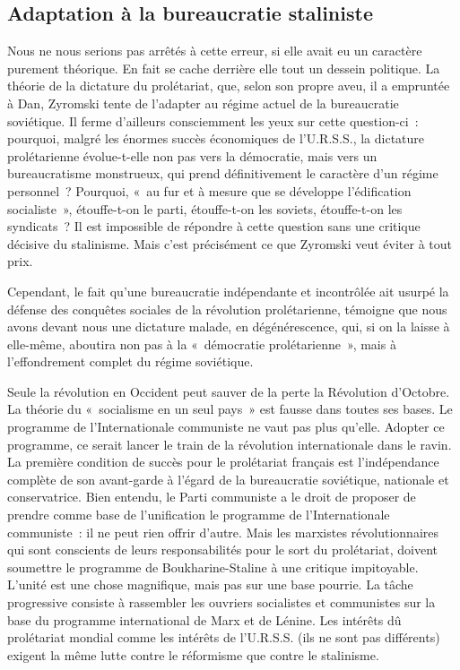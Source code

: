 \documentclass[french,twoside]{book} %
\begin{document}
\subsection[{Adaptation à la bureaucratie staliniste}]{Adaptation à la bureaucratie staliniste}
\noindent Nous ne nous serions pas arrêtés à cette erreur, si elle avait eu un caractère purement théorique. En fait se cache derrière elle tout un dessein politique. La théorie de la dictature du prolétariat, que, selon son propre aveu, il a empruntée à Dan, Zyromski tente de l’adapter au régime actuel de la bureaucratie soviétique. Il ferme d’ailleurs consciemment les yeux sur cette question-ci : pourquoi, malgré les énormes succès économiques de l’U.R.S.S., la dictature prolétarienne évolue-t-elle non pas vers la démocratie, mais vers un bureaucratisme monstrueux, qui prend définitivement le caractère d’un régime personnel ? Pourquoi, « au fur et à mesure que se développe l’édification socialiste », étouffe-t-on le parti, étouffe-t-on les soviets, étouffe-t-on les syndicats ? Il est impossible de  répondre à cette question sans une critique décisive du stalinisme. Mais c’est précisément ce que Zyromski veut éviter à tout prix.\par
Cependant, le fait qu’une bureaucratie indépendante et incontrôlée ait usurpé la défense des conquêtes sociales de la révolution prolétarienne, témoigne que nous avons devant nous une dictature malade, en dégénérescence, qui, si on la laisse à elle-même, aboutira non pas à la « démocratie prolétarienne », mais à l’effondrement complet du régime soviétique.\par
Seule la révolution en Occident peut sauver de la perte la Révolution d’Octobre. La théorie du « socialisme en un seul pays » est fausse dans toutes ses bases. Le programme de l’Internationale communiste ne vaut pas plus qu’elle. Adopter ce programme, ce serait lancer le train de la révolution internationale dans le ravin. La première condition de succès pour le prolétariat français est l’indépendance complète de son avant-garde à l’égard de la bureaucratie soviétique, nationale et conservatrice. Bien entendu, le Parti communiste a le droit de proposer de prendre comme base de l’unification le programme de l’Internationale communiste : il ne peut rien offrir d’autre. Mais les marxistes révolutionnaires qui sont conscients de leurs responsabilités pour le sort du prolétariat, doivent soumettre le programme de Boukharine-Staline à une critique impitoyable. L’unité est une chose magnifique, mais pas sur une base pourrie. La tâche progressive consiste à rassembler les ouvriers socialistes et communistes sur la base du programme international de Marx et de Lénine. Les intérêts dû prolétariat mondial comme les intérêts de l’U.R.S.S. (ils ne sont pas différents) exigent la même lutte contre le réformisme que contre le stalinisme.
\end{document}

